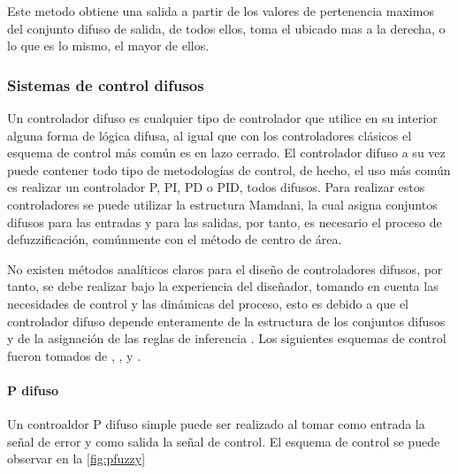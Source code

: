                 Este metodo obtiene una salida a partir de los valores de pertenencia maximos del conjunto difuso de salida, de todos ellos, toma el ubicado mas a la derecha, o lo que es lo mismo, el mayor de ellos.

        \subsubsection{Sistemas de control difusos}
            
            Un controlador difuso es cualquier tipo de controlador que utilice en su interior alguna forma de lógica difusa, al igual que con los controladores clásicos el esquema de control más común es en lazo cerrado. El controlador difuso a su vez puede contener todo tipo de metodologías de control, de hecho, el uso más común es realizar un controlador P, PI, PD o PID, todos difusos. Para realizar estos controladores se puede utilizar la estructura Mamdani, la cual asigna conjuntos difusos para las entradas y para las salidas, por tanto, es necesario el proceso de defuzzificación, comúnmente con el método de centro de área.
            
            No existen métodos analíticos claros para el diseño de controladores difusos, por tanto, se debe realizar bajo la experiencia del diseñador, tomando en cuenta las necesidades de control y las dinámicas del proceso, esto es debido a que el controlador difuso depende enteramente de la estructura de los conjuntos difusos y de la asignación de las reglas de inferencia \Parencite{cruz2010inteligencia}. Los siguientes esquemas de control fueron tomados de \textcite{cruz2010inteligencia}, \textcite{riid2003transparent}, y \textcite{clavier2017tecnicas}.

            \paragraph{P difuso}
                
                Un controaldor P difuso simple puede ser realizado al tomar como entrada la señal de error y como salida la señal de control. El esquema de control se puede observar en la \cref{fig:pfuzzy}

